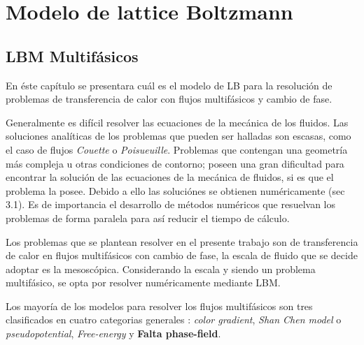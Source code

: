 \chapter{Modelo de lattice Boltzmann}
\graphicspath{{figs/cap2/}}
\label{cap2}

\section{LBM Multifásicos}

En éste capítulo se presentara cuál es el modelo de LB para la resolución de problemas de transferencia de calor con flujos multifásicos y cambio de fase.

Generalmente es difícil resolver las ecuaciones de la mecánica de los fluidos. Las soluciones analíticas de los problemas que pueden ser halladas son escasas, como el caso de flujos \textit{Couette} o \textit{Poisueuille}. Problemas que contengan una geometría más compleja u otras condiciones de contorno; poseen una gran dificultad para encontrar la solución de las ecuaciones de la mecánica de fluidos, si es que el problema la posee. Debido a ello las soluciónes se obtienen numéricamente \cite{kruger2017lattice}(sec 3.1). Es de importancia el desarrollo de métodos numéricos que resuelvan los problemas de forma paralela para así reducir el tiempo de cálculo.

Los problemas que se plantean resolver en el presente trabajo son de transferencia de calor en flujos multifásicos con cambio de fase, la escala de fluido que se decide adoptar es la mesoscópica. Considerando la escala y siendo un problema multifásico, se opta por resolver numéricamente mediante LBM. 


Los mayoría de los modelos para resolver los flujos multifásicos son tres clasificados en cuatro categorias generales : \textit{color gradient}, \textit{Shan Chen model} o \textit{pseudopotential}, \textit{Free-energy} y \textbf{Falta phase-field}. 

